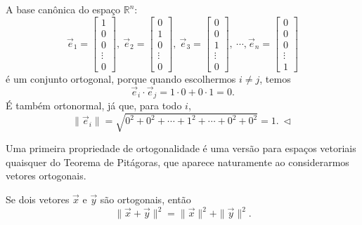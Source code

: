 \documentclass[../livro.tex]{subfiles}  %
\begin{document}
\begin{example}
	A base canônica do espaço $\mathbb{R}^n$:
	\begin{equation}
	\vec{e}_1 =
	\begin{bmatrix}
	1 \\ 0 \\ 0 \\ \vdots \\ 0
	\end{bmatrix}, \
	\vec{e}_2 =
	\begin{bmatrix}
	0 \\ 1 \\ 0 \\ \vdots \\ 0
	\end{bmatrix}, \
	\vec{e}_3 =
	\begin{bmatrix}
	0 \\ 0 \\ 1 \\ \vdots \\ 0
	\end{bmatrix}, \ \cdots,
	\vec{e}_n =
	\begin{bmatrix}
	0 \\ 0 \\ 0 \\ \vdots \\ 1
	\end{bmatrix}
	\end{equation} é um conjunto ortogonal, porque quando escolhermos $i\neq j$, temos
	\begin{equation}
	\vec{e}_i \cdot \vec{e}_j = 1 \cdot 0 + 0 \cdot 1 = 0. 
	\end{equation} É também ortonormal, já que, para todo $i$,
	\begin{equation}
	\| \vec{e}_i\|  = \sqrt{0^2 + 0^2 + \cdots + 1^2 + \cdots + 0^2 + 0^2} = 1. \ \lhd
	\end{equation}
\end{example}

Uma primeira propriedade de ortogonalidade é uma versão para espaços vetoriais quaisquer do Teorema de Pitágoras, que aparece naturamente ao considerarmos vetores ortogonais.

\begin{theorem}
	Se dois vetores $\vec{x}$ e $\vec{y}$ são ortogonais, então
	\begin{equation}
	\|\vec{x} + \vec{y}\|^2 = \|\vec{x}\|^2 + \|\vec{y}\|^2.
	\end{equation}
\end{theorem}
\end{document}
